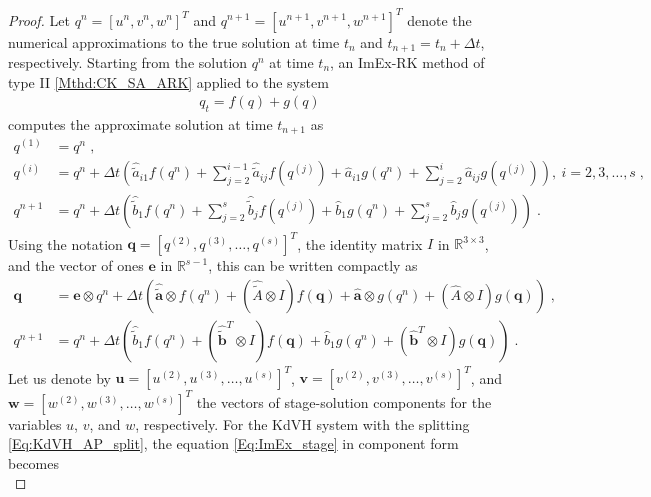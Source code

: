 \documentclass[10pt,a4paper]{amsart}
\newcommand{\tIIAex}{\hat{\tilde{A}}}
\newcommand{\tIIAim}{\hat{A}}
\newcommand{\tIIaex}{\pmb{\hat{\tilde{a}}}}
\newcommand{\tIIaim}{\pmb{\hat{a}}}
\newcommand{\tIIbexf}{\hat{\tilde{b}}_1}
\newcommand{\tIIbex}{\pmb{\hat{\tilde{b}}}}
\newcommand{\tIIbimf}{\hat{b}_1}
\newcommand{\tIIbim}{\pmb{\hat{b}}}
\begin{document}
\begin{proof}
Let $q^n = [u^n, v^n, w^n]^T$ and $q^{n+1} = [u^{n+1}, v^{n+1}, w^{n+1}]^T$ denote the numerical approximations to the true solution at time $t_n$ and $t_{n+1} = t_n + \Delta t$, respectively.
Starting from the solution $q^n$ at time $t_n$, an ImEx-RK method of type II \eqref{Mthd:CK_SA_ARK} applied to the system
\begin{align*}
    q_t = f(q) + g(q)
\end{align*}
computes the approximate solution at time $t_{n+1}$ as
\begin{subequations}\label{Eq:ImEx_mthd}
\begin{align}
    q^{(1)} & = q^n \;, \\
    q^{(i)} & = q^n + \Delta t \left( \hat{\tilde{a}}_{i1} f(q^n) + \sum_{j = 2}^{i-1} \hat{\tilde{a}}_{ij} f(q^{(j)}) + \hat{a}_{i1} g(q^n) + \sum_{j = 2}^{i} \hat{a}_{ij} g(q^{(j)}) \right), \ i = 2,3, \ldots, s \;, \\
    q^{n+1} & = q^n + \Delta t \left( \tIIbexf f(q^n) + \sum_{j = 2}^{s} \hat{\tilde{b}}_{j} f(q^{(j)}) + \tIIbimf g(q^n) + \sum_{j = 2}^{s} \hat{b}_{j}  g(q^{(j)}) \right) \;.
\end{align}
\end{subequations}
Using the notation $\pmb{q} = [q^{(2)}, q^{(3)}, \dots, q^{(s)}]^T$, the identity matrix $I$ in $\mathbb{R}^{3 \times 3}$, and the vector of ones $\pmb{e}$ in $\mathbb{R}^{s-1}$, this can be written compactly as
\begin{subequations}
\begin{align}
    \pmb{q} &= \pmb{e} \otimes q^n + \Delta t \left( \tIIaex \otimes f(q^n) + (\tIIAex \otimes I) f(\pmb{q}) + \tIIaim \otimes g(q^n) + (\tIIAim \otimes I) g(\pmb{q}) \right) \;, \label{Eq:ImEx_stage} \\
    q^{n+1} &= q^n + \Delta t \left( \tIIbexf f(q^n) + (\tIIbex^T \otimes I) f(\pmb{q}) + \tIIbimf g(q^n) + (\tIIbim^T \otimes I) g(\pmb{q}) \right) \;. \label{Eq:ImEx_sol}
\end{align}
\end{subequations}
Let us denote by $\pmb{u} = [u^{(2)}, u^{(3)}, \dots, u^{(s)}]^T$, $\pmb{v} = [v^{(2)}, v^{(3)}, \dots, v^{(s)}]^T$, and $\pmb{w} = [w^{(2)}, w^{(3)}, \dots, w^{(s)}]^T$ the vectors of stage-solution components for the variables $u$, $v$, and $w$, respectively. For the KdVH system with the splitting \eqref{Eq:KdVH_AP_split}, the equation \eqref{Eq:ImEx_stage} in component form becomes
\begin{subequations}

\end{subequations}
\end{proof}
\end{document}
